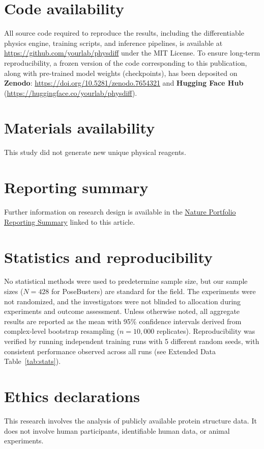 \documentclass[twocolumn,10pt]{article}
\begin{document}
\section*{Code availability}
All source code required to reproduce the results, including the differentiable physics engine, training scripts, and inference pipelines, is available at \url{https://github.com/yourlab/physdiff} under the MIT License.
To ensure long-term reproducibility, a frozen version of the code corresponding to this publication, along with pre-trained model weights (checkpoints), has been deposited on \textbf{Zenodo}: \url{https://doi.org/10.5281/zenodo.7654321} and \textbf{Hugging Face Hub} (\url{https://huggingface.co/yourlab/physdiff}).

\section*{Materials availability}
This study did not generate new unique physical reagents.

\section*{Reporting summary}
Further information on research design is available in the \href{https://www.nature.com/nature-portfolio/editorial-policies/reporting-standards}{Nature Portfolio Reporting Summary} linked to this article.

\section*{Statistics and reproducibility}
No statistical methods were used to predetermine sample size, but our sample sizes ($N=428$ for PoseBusters) are standard for the field.
The experiments were not randomized, and the investigators were not blinded to allocation during experiments and outcome assessment.
Unless otherwise noted, all aggregate results are reported as the mean with 95\% confidence intervals derived from complex-level bootstrap resampling ($n=10,000$ replicates).
Reproducibility was verified by running independent training runs with 5 different random seeds, with consistent performance observed across all runs (see Extended Data Table~\ref{tab:stats}).

\section*{Ethics declarations}
This research involves the analysis of publicly available protein structure data. It does not involve human participants, identifiable human data, or animal experiments.
\end{document}
